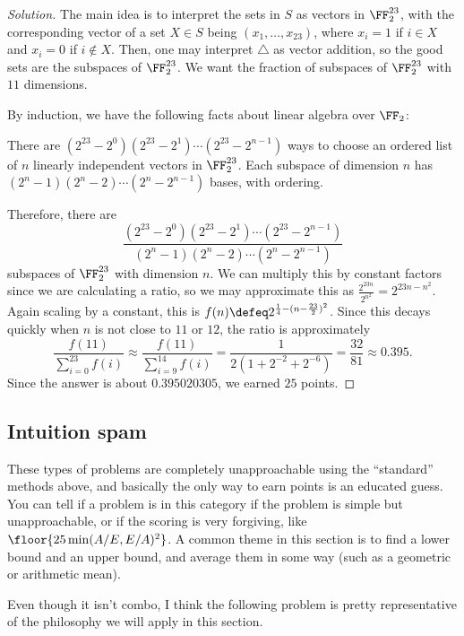\documentclass[11pt]{scrartcl}
\renewenvironment{solution}{\renewcommand\qedsymbol{$\blacksquare$}\begin{proof}[Solution]}{\end{proof}}
\begin{document}
\begin{solution}
    The main idea is to interpret the sets in $S$ as vectors in $\FF_2^{23}$, with the corresponding vector of a set $X \in S$ being $(x_1,\dots,x_{23})$, where $x_i = 1$ if $i \in X$ and $x_i = 0$ if $i \not\in X$. Then, one may interpret $\triangle$ as vector addition, so the good sets are the subspaces of $\FF_2^{23}$. We want the fraction of subspaces of $\FF_2^{23}$ with $11$ dimensions.
    
    By induction, we have the following facts about linear algebra over $\FF_2$:
    \begin{itemize}
		\ii There are $(2^{23} - 2^0)(2^{23} - 2^1)\cdots(2^{23} - 2^{n - 1})$ ways to choose an ordered list of $n$ linearly independent vectors in $\FF_2^{23}$.
		\ii Each subspace of dimension $n$ has $(2^n - 1)(2^n - 2)\cdots(2^n - 2^{n - 1})$ bases, with ordering.
    \end{itemize}
    Therefore, there are
    \[\frac{(2^{23} - 2^0)(2^{23} - 2^1)\cdots(2^{23} - 2^{n - 1})}{(2^n - 1)(2^n - 2) \cdots (2^n - 2^{n - 1})}\]
    subspaces of $\FF_2^{23}$ with dimension $n$. We can multiply this by constant factors since we are calculating a ratio, so we may approximate this as $\frac{2^{23n}}{2^{n^2}} = 2^{23n - n^2}$. Again scaling by a constant, this is $f(n) \defeq 2^{\frac14 -(n - \frac{23}2)^2}$. Since this decays quickly when $n$ is not close to $11$ or $12$, the ratio is approximately
    \[\frac{f(11)}{\sum_{i = 0}^{23}f(i)} \approx \frac{f(11)}{\sum_{i = 9}^{14}f(i)} = \frac1{2(1 + 2^{-2} + 2^{-6})} = \frac{32}{81} \approx 0.395.\]
    Since the answer is about $0.395020305$, we earned $25$ points.
\end{solution}

\subsection{Intuition spam}

These types of problems are completely unapproachable using the ``standard'' methods above, and basically the only way to earn points is an educated guess. You can tell if a problem is in this category if the problem is simple but unapproachable, or if the scoring is very forgiving, like $\floor{25\min(A/E,E/A)^2}$. A common theme in this section is to find a lower bound and an upper bound, and average them in some way (such as a geometric or arithmetic mean).

Even though it isn't combo, I think the following problem is pretty representative of the philosophy we will apply in this section.
\end{document}
